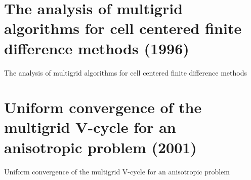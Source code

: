 \section{The analysis of multigrid algorithms for cell centered finite difference methods (1996)}
The analysis of multigrid algorithms for cell centered finite difference methods\cite{bramble1996analysis}



%

\section{Uniform convergence of the multigrid V-cycle for an anisotropic problem (2001)}
Uniform convergence of the multigrid V-cycle for an anisotropic problem\cite{bramble2001uniform}











